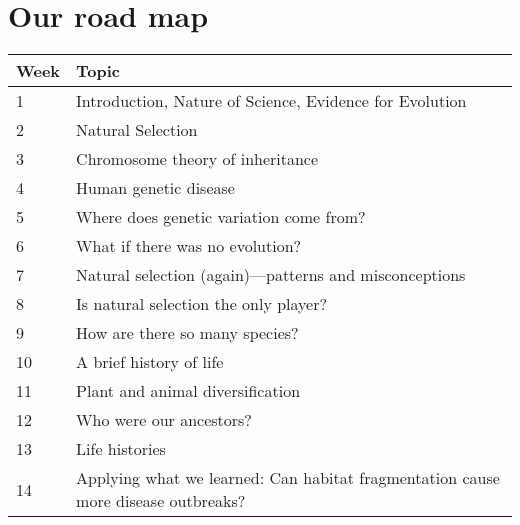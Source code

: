 \section{Our road map}

\noindent\begin{tabular}{ p{0.8in} p{5.0in} }
    \hline
    \textbf{Week} & \textbf{Topic} \\
    \hline
    1  & Introduction, Nature of Science, Evidence for Evolution \\
    2  & Natural Selection \\
    3  & Chromosome theory of inheritance \\
    4  & Human genetic disease \\
    5  & Where does genetic variation come from? \\
    6  & What if there was no evolution? \\
    7  & Natural selection (again)---patterns and misconceptions \\
    8  & Is natural selection the only player? \\
    9  & How are there so many species? \\
    10 & A brief history of life \\
    11 & Plant and animal diversification \\
    12 & Who were our ancestors? \\
    13 & Life histories \\
    14 & Applying what we learned: Can habitat fragmentation cause more
                disease outbreaks? \\
    \hline
\end{tabular}


